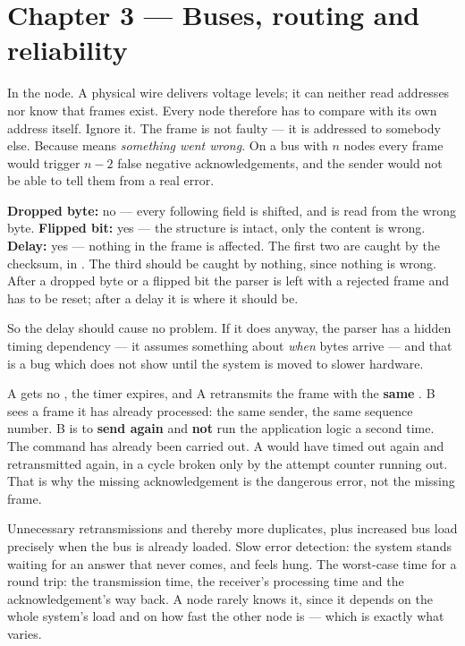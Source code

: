 \section*{Chapter 3 --- Buses, routing and reliability}

 In the node. A physical wire delivers voltage levels; it can neither read addresses nor
know that frames exist. Every node therefore has to compare  with its own address
itself.
 Ignore it. The frame is not faulty --- it is addressed to somebody else.
 Because  means \emph{something went wrong}. On a bus with $n$ nodes every frame
would trigger $n-2$ false negative acknowledgements, and the sender would not be able to tell them
from a real error.

 \textbf{Dropped byte:} no --- every following field is shifted, and  is read from
the wrong byte. \textbf{Flipped bit:} yes --- the structure is intact, only the content is wrong.
\textbf{Delay:} yes --- nothing in the frame is affected.
 The first two are caught by the checksum, in . The third should be
caught by nothing, since nothing is wrong.
 After a dropped byte or a flipped bit the parser is left with a rejected frame and has to
be reset; after a delay it is where it should be.

So the delay should cause no problem. If it does anyway, the parser has a hidden timing dependency
--- it assumes something about \emph{when} bytes arrive --- and that is a bug which does not show
until the system is moved to slower hardware.

 A gets no , the timer expires, and A retransmits the frame with the
\textbf{same} .
 B sees a frame it has already processed: the same sender, the same sequence number.
 B is to \textbf{send  again} and \textbf{not} run the application logic a second
time. The command has already been carried out.
 A would have timed out again and retransmitted again, in a cycle broken only by the
attempt counter running out. That is why the missing acknowledgement is the dangerous error, not
the missing frame.

 Unnecessary retransmissions and thereby more duplicates, plus increased bus load precisely
when the bus is already loaded.
 Slow error detection: the system stands waiting for an answer that never comes, and feels
hung.
 The worst-case time for a round trip: the transmission time, the receiver's processing
time and the acknowledgement's way back. A node rarely knows it, since it depends on the whole
system's load and on how fast the other node is --- which is exactly what varies.

